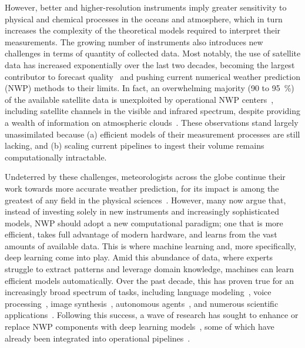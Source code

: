 However, better and higher-resolution instruments imply greater sensitivity to physical and chemical processes in the oceans and atmosphere, which in turn increases the complexity of the theoretical models required to interpret their measurements. The growing number of instruments also introduces new challenges in terms of quantity of collected data. Most notably, the use of satellite data has increased exponentially over the last two decades, becoming the largest contributor to forecast quality~\cite{jeppesen2020ecmwfs} and pushing current numerical weather prediction (NWP) methods to their limits. In fact, an overwhelming majority (90 to \qty{95}{\percent}) of the available satellite data is unexploited by operational NWP centers~\cite{bauer2015quiet}, including satellite channels in the visible and infrared spectrum, despite providing a wealth of information on atmospheric clouds~\cite{scheck2020assimilating, kugler2023potential}. These observations stand largely unassimilated because (a) efficient models of their measurement processes are still lacking, and (b) scaling current pipelines to ingest their volume remains computationally intractable.

Undeterred by these challenges, meteorologists across the globe continue their work towards more accurate weather prediction, for its impact is among the greatest of any field in the physical sciences~\cite{bauer2015quiet}. However, many now argue that, instead of investing solely in new instruments and increasingly sophisticated models, NWP should adopt a new computational paradigm; one that is more efficient, takes full advantage of modern hardware, and learns from the vast amounts of available data. This is where machine learning and, more specifically, deep learning come into play. Amid this abundance of data, where experts struggle to extract patterns and leverage domain knowledge, machines can learn efficient models automatically. Over the past decade, this has proven true for an increasingly broad spectrum of tasks, including language modeling~\cite{vaswani2017attention, devlin2019bert, brown2020language}, voice processing~\cite{oord2016wavenet, radford2022robust, goel2022its}, image synthesis~\cite{zhu2017unpaired, karras2019stylebased, rombach2022highresolution}, autonomous agents~\cite{mnih2015humanlevel, silver2017mastering, baker2020emergent, andrychowicz2020learning, wei2022chainofthought}, and numerous scientific applications~\cite{jumper2021highly, rolnick2022tackling, degrave2022magnetic, merchant2023scaling, pfau2024accurate, manduchi2024leveraging}. Following this success, a wave of research has sought to enhance or replace NWP components with deep learning models~\cite{ravuri2021skilful, dueben2021machine, mack2020attentionbased, brajard2020combining, brajard2021combining, arcucci2021deep, fablet2021learning, frerix2021variational, buizza2022data, yeung2022physicsinformed, andrychowicz2023deep, lam2023learning}, some of which have already been integrated into operational pipelines~\cite{lang2024aifs, lentze2025ecmwfs}.

